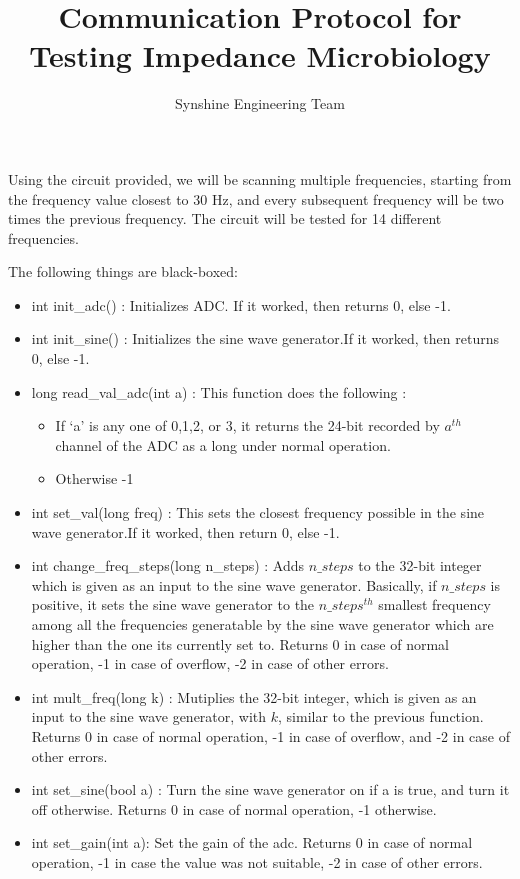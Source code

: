 \documentclass [a4paper,11pt]{article}
\begin{document}
\title{Communication Protocol for Testing Impedance Microbiology}
\author{Synshine Engineering Team}
\date{}
\maketitle

Using the circuit provided, we will be scanning multiple frequencies, starting from the frequency value closest to 30 Hz, and every subsequent frequency will be two times the previous frequency. The circuit will be tested for 14 different frequencies.

The following things are black-boxed:
\begin{itemize}
\item int init\_adc() : Initializes ADC. If it worked, then returns 0, else -1.
\item int init\_sine() : Initializes the sine wave generator.If it worked, then returns 0, else -1.
\item long read\_val\_adc(int a) : This function does the following :
	\begin{itemize}
		\item If `a' is any one of 0,1,2, or 3, it returns the 24-bit recorded by $a^{th}$ channel of the ADC as a long  under normal operation.
		\item Otherwise -1
	\end{itemize}
\item int set\_val(long freq) : This sets the closest frequency possible in the sine wave generator.If it worked, then return 0, else -1.
\item int change\_freq\_steps(long n\_steps) : Adds $n\_steps$ to the 32-bit integer which is given as an input to the sine wave generator. Basically, if $n\_steps$ is positive, it sets the sine wave generator to the $n\_steps^{th}$ smallest frequency among all the frequencies generatable by the sine wave generator which are higher than the one its currently set to. Returns 0 in case of normal operation, -1 in case of overflow, -2 in case of other errors.
\item int mult\_freq(long k) : Mutiplies the 32-bit integer, which is given as an input to the sine wave generator, with $k$, similar to the previous function. Returns 0 in case of normal operation, -1 in case of overflow, and -2 in case of other errors.
\item int set\_sine(bool a) : Turn the sine wave generator on if a is true, and turn it off otherwise. Returns 0 in case of normal operation, -1 otherwise.
\item int set\_gain(int a): Set the gain of the adc. Returns 0 in case of normal operation, -1 in case the value was not suitable, -2 in case of other errors.
\end{itemize}
\end{document}
